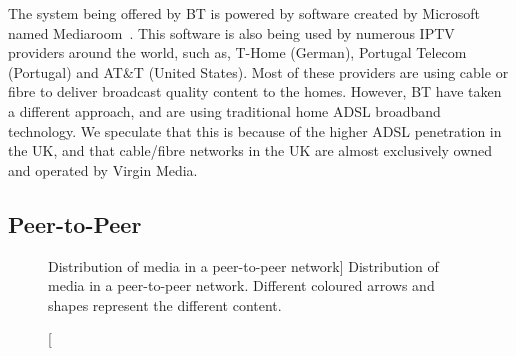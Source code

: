     The system being offered by BT is powered by software created by Microsoft named Mediaroom~\cite{microsoft2008m}. This software is also being used by numerous IPTV providers around the world, such as, T-Home (German), Portugal Telecom (Portugal) and AT\&T (United States). Most of these providers are using cable or fibre to deliver broadcast quality content to the homes. However, BT have taken a different approach, and are using traditional home ADSL broadband technology. We speculate that this is because of the higher ADSL penetration in the UK, and that cable/fibre networks in the UK are almost exclusively owned and operated by Virgin Media.


\subsection{Peer-to-Peer}
\label{sect:peer-to-peer}

\begin{figure}[t]
    \centering


    \caption
        [Distribution of media in a peer-to-peer network]
        {Distribution of media in a peer-to-peer network. Different coloured arrows and shapes represent the different content.}
    \label{fig:p2p}
\end{figure}


